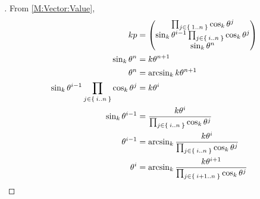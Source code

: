 \documentclass[stu, babel, american, biblatex, a4paper, leqno, draftall]{apa7}
\begin{document}
\begin{proof}[]
    From \cref{M:Vector:Value},
    \begin{align*}
        kp                                                                                 & = \begin{pmatrix}
                                                                                                   \prod_{j\in\Set{1..n}}{\cos_k{\tensor{\theta}{^j}}}                                \\
                                                                                                   \sin_k{\tensor{\theta}{^{i-1}}}\prod_{j\in\Set{i..n}}{\cos_k{\tensor{\theta}{^j}}} \\
                                                                                                   \sin_k{{\tensor{\theta}{^n}}}                                                      \\
                                                                                               \end{pmatrix}                \\
        \sin_k{{\tensor{\theta}{^n}}}                                                      & = k\tensor{\theta}{^{n+1}}                                                                                            \\
        \tensor{\theta}{^n}                                                                & = \arcsin_k{k\tensor{\theta}{^{n+1}}}                                                                                 \\
        \sin_k{\tensor{\theta}{^{i-1}}}\prod_{j\in\Set{i..n}}{\cos_k{\tensor{\theta}{^j}}} & = k\tensor{\theta}{^{i}}                                                                                              \\
        \sin_k{\tensor{\theta}{^{i-1}}}                                                    & = \frac{k\tensor{\theta}{^{i}}}{\prod_{j\in\Set{i..n}}{\cos_k{\tensor{\theta}{^j}}}}                                  \\
        \tensor{\theta}{^{i-1}}                                                            & = \arcsin_k{\frac{k\tensor{\theta}{^{i}}}{\prod_{j\in\Set{i..n}}{\cos_k{\tensor{\theta}{^j}}}}}                       \\
        \tensor{\theta}{^i}                                                                & = \arcsin_k{\frac{k\tensor{\theta}{^{i+1}}}{\prod_{j\in\Set{i+1..n}}{\cos_k{\tensor{\theta}{^j}}}}}                   \\

\end{align*}
\end{proof}
\end{document}
